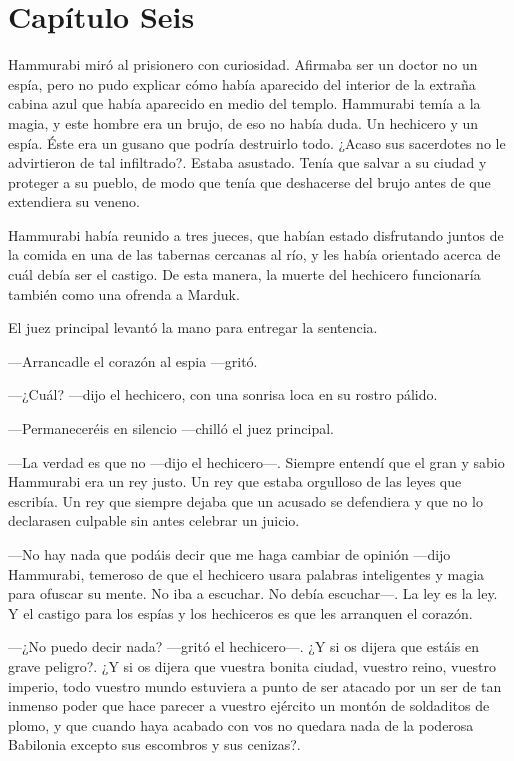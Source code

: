 \chapter*{Capítulo Seis}


Hammurabi miró al prisionero con curiosidad. Afirmaba ser un doctor no
un espía, pero no pudo explicar cómo había aparecido del interior de la
extraña cabina azul que había aparecido en medio del templo. Hammurabi
temía a la magia, y este hombre era un brujo, de eso no había duda. Un
hechicero y un espía. Éste era un gusano que podría destruirlo todo.
¿Acaso sus sacerdotes no le advirtieron de tal infiltrado?. Estaba
asustado. Tenía que salvar a su ciudad y proteger a su pueblo, de modo
que tenía que deshacerse del brujo antes de que extendiera su veneno.

Hammurabi había reunido a tres jueces, que habían estado disfrutando
juntos de la comida en una de las tabernas cercanas al río, y les había
orientado acerca de cuál debía ser el castigo. De esta manera, la muerte
del hechicero funcionaría también como una ofrenda a Marduk.

El juez principal levantó la mano para entregar la sentencia.

---Arrancadle el corazón al espia ---gritó.

---¿Cuál? ---dijo el hechicero, con una sonrisa loca en su rostro
pálido.

---Permaneceréis en silencio ---chilló el juez principal.

---La verdad es que no ---dijo el hechicero---. Siempre entendí que el
gran y sabio Hammurabi era un rey justo. Un rey que estaba orgulloso de
las leyes que escribía. Un rey que siempre dejaba que un acusado se
defendiera y que no lo declarasen culpable sin antes celebrar un juicio.

---No hay nada que podáis decir que me haga cambiar de opinión ---dijo
Hammurabi, temeroso de que el hechicero usara palabras inteligentes y
magia para ofuscar su mente. No iba a escuchar. No debía escuchar---. La
ley es la ley. Y el castigo para los espías y los hechiceros es que les
arranquen el corazón.

---¿No puedo decir nada? ---gritó el hechicero---. ¿Y si os dijera que
estáis en grave peligro?. ¿Y si os dijera que vuestra bonita ciudad,
vuestro reino, vuestro imperio, todo vuestro mundo estuviera a punto de
ser atacado por un ser de tan inmenso poder que hace parecer a vuestro
ejército un montón de soldaditos de plomo, y que cuando haya acabado con
vos no quedara nada de la poderosa Babilonia excepto sus escombros y sus
cenizas?.

